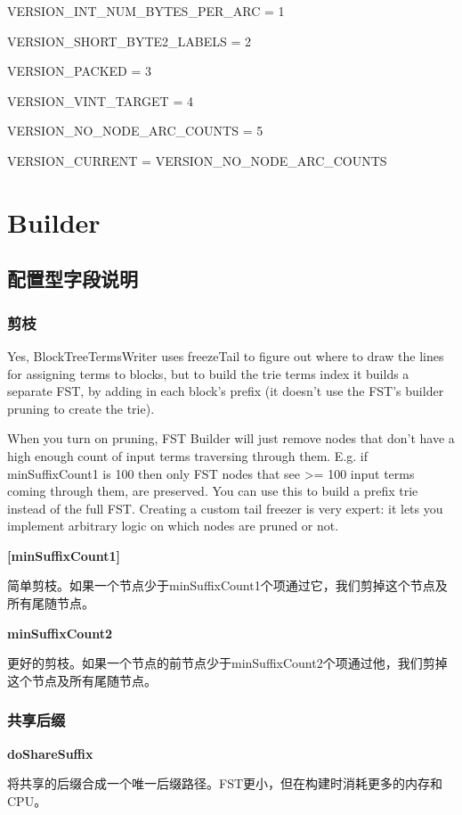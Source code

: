\documentclass{article}
\begin{document}
VERSION\_INT\_NUM\_BYTES\_PER\_ARC = 1

VERSION\_SHORT\_BYTE2\_LABELS = 2

VERSION\_PACKED = 3

VERSION\_VINT\_TARGET = 4

VERSION\_NO\_NODE\_ARC\_COUNTS = 5

VERSION\_CURRENT = VERSION\_NO\_NODE\_ARC\_COUNTS


\section{Builder}

\subsection{配置型字段说明}

\subsubsection{剪枝}

Yes, BlockTreeTermsWriter uses freezeTail to figure out where to draw
the lines for assigning terms to blocks, but to build the trie terms
index it builds a separate FST, by adding in each block's prefix (it
doesn't use the FST's builder pruning to create the trie).


When you turn on pruning, FST Builder will just remove nodes that don't have a high enough count of input terms traversing through them. E.g. if minSuffixCount1 is 100 then only FST nodes that see >= 100 input terms coming through them, are preserved. You can use this to build a prefix trie instead of the full FST. Creating a custom tail freezer is very expert: it lets you implement arbitrary logic on which nodes are pruned or not\cite{lucene-fst-prune, lucene-fst-prune-2}.

\textbf{[minSuffixCount1]}

简单剪枝。如果一个节点少于minSuffixCount1个项通过它，我们剪掉这个节点及所有尾随节点。

\textbf{minSuffixCount2}

更好的剪枝。如果一个节点的前节点少于minSuffixCount2个项通过他，我们剪掉这个节点及所有尾随节点。

\subsubsection{共享后缀}
\textbf{doShareSuffix}

将共享的后缀合成一个唯一后缀路径。FST更小，但在构建时消耗更多的内存和CPU。
\end{document}
